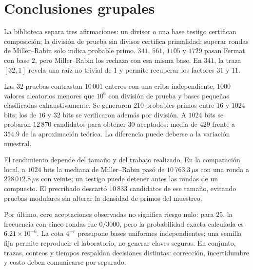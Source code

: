\section{Conclusiones grupales}
La biblioteca separa tres afirmaciones: un divisor o una base testigo certifican composición; la división de prueba sin divisor certifica primalidad; superar rondas de Miller--Rabin solo indica probable primo. $341$, $561$, $1105$ y $1729$ pasan Fermat con base $2$, pero Miller--Rabin los rechaza con esa misma base. En $341$, la traza $[32,1]$ revela una raíz no trivial de $1$ y permite recuperar los factores $31$ y $11$.

Las 32 pruebas contrastan $10\,001$ enteros con una criba independiente, $1000$ valores aleatorios menores que $10^6$ con división de prueba y bases pequeñas clasificadas exhaustivamente. Se generaron $210$ probables primos entre $16$ y $1024$ bits; los de $16$ y $32$ bits se verificaron además por división. A $1024$ bits se probaron $12\,870$ candidatos para obtener $30$ aceptados: media de $429$ frente a $354.9$ de la aproximación teórica. La diferencia puede deberse a la variación muestral.

El rendimiento depende del tamaño y del trabajo realizado. En la comparación local, a $1024$ bits la mediana de Miller--Rabin pasó de $10\,763.3\,\mu\mathrm{s}$ con una ronda a $228\,012.8\,\mu\mathrm{s}$ con veinte; un testigo puede detener antes las rondas de un compuesto. El precribado descartó $10\,833$ candidatos de ese tamaño, evitando pruebas modulares sin alterar la densidad de primos del muestreo.

Por último, cero aceptaciones observadas no significa riesgo nulo: para $25$, la frecuencia con cinco rondas fue $0/3000$, pero la probabilidad exacta calculada es $6.21\times10^{-6}$. La cota $4^{-r}$ presupone bases uniformes independientes; una semilla fija permite reproducir el laboratorio, no generar claves seguras. En conjunto, trazas, conteos y tiempos respaldan decisiones distintas: corrección, incertidumbre y costo deben comunicarse por separado.
